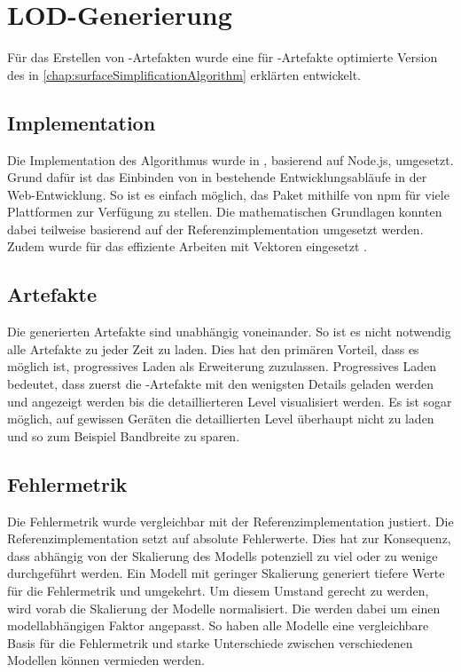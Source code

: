 \section{LOD-Generierung}

Für das Erstellen von -Artefakten wurde eine für -Artefakte optimierte Version des in \autoref{chap:surfaceSimplificationAlgorithm} erklärten  entwickelt.

\subsection{Implementation}

Die Implementation des Algorithmus wurde in , basierend auf \gls{Node.js}, umgesetzt. Grund dafür ist das Einbinden von  in bestehende Entwicklungsabläufe in der Web-Entwicklung. So ist es einfach möglich, das Paket mithilfe von \gls{npm} für viele Plattformen zur Verfügung zu stellen.
Die mathematischen Grundlagen konnten dabei teilweise basierend auf der Referenzimplementation umgesetzt werden. Zudem wurde  für das effiziente Arbeiten mit Vektoren eingesetzt \cite{glMatrix}.

\subsection{Artefakte}

Die generierten Artefakte sind unabhängig voneinander. So ist es nicht notwendig alle Artefakte zu jeder Zeit zu laden. Dies hat den primären Vorteil, dass es möglich ist, progressives Laden als Erweiterung zuzulassen. Progressives Laden bedeutet, dass zuerst die -Artefakte mit den wenigsten Details geladen werden und angezeigt werden bis die detaillierteren Level visualisiert werden.
Es ist sogar möglich, auf gewissen Geräten die detaillierten Level überhaupt nicht zu laden und so zum Beispiel Bandbreite zu sparen.

\subsection{Fehlermetrik}

Die Fehlermetrik wurde vergleichbar mit der Referenzimplementation justiert. Die Referenzimplementation setzt auf absolute Fehlerwerte. Dies hat zur Konsequenz, dass abhängig von der Skalierung des Modells potenziell zu viel oder zu wenige  durchgeführt werden. Ein Modell mit geringer Skalierung generiert tiefere Werte für die Fehlermetrik und umgekehrt. Um diesem Umstand gerecht zu werden, wird vorab die Skalierung der Modelle normalisiert. Die  werden dabei um einen modellabhängigen Faktor angepasst. So haben alle Modelle eine vergleichbare Basis für die Fehlermetrik und starke Unterschiede zwischen verschiedenen Modellen können vermieden werden.

